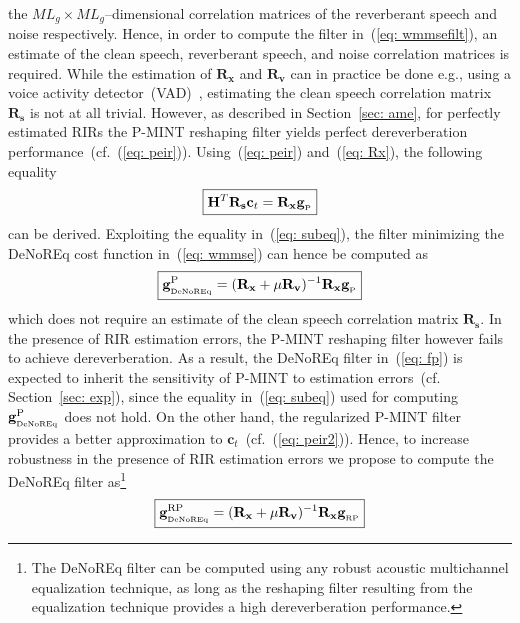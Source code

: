 \documentclass{article}
\begin{document}
the $ML_g \times ML_g$--dimensional correlation matrices of the reverberant speech and noise respectively.
Hence, in order to compute the filter in~(\ref{eq: wmmsefilt}), an estimate of the clean speech, reverberant speech, and noise correlation matrices is required. 
While the estimation of $\mathbf{R}_{\mathbf{x}}$ and $\mathbf{R}_{\mathbf{v}}$ can in practice be done e.g., using a voice activity detector~(VAD)~\cite{Ramirez_SC_2004}, estimating the clean speech correlation matrix $\mathbf{R}_{\mathbf{s}}$ is not at all trivial. 
However, as described in Section~\ref{sec: ame}, for perfectly estimated RIRs the P-MINT reshaping filter yields perfect dereverberation performance~(cf.~(\ref{eq: peir})).
Using~(\ref{eq: peir}) and~(\ref{eq: Rx}), the following equality
\begin{equation}
\label{eq: subeq}
\boxed{\mathbf{H}^T \mathbf{R}_{\mathbf{s}}\mathbf{c}_t = \mathbf{R}_{\mathbf{x}}\mathbf{g}_{_{\rm P}}}
\end{equation}
can be derived.
Exploiting the equality in~(\ref{eq: subeq}), the filter minimizing the DeNoREq cost function in~(\ref{eq: wmmse}) can hence be computed as
\begin{equation}
  \label{eq: fp}
\boxed{\mathbf{g}_{_{\rm DeNoREq}}^{\rm P} = (\mathbf{R}_{\mathbf{x}} + \mu \mathbf{R}_{\mathbf{v}})^{-1} \mathbf{R}_{\mathbf{x}} \mathbf{g}_{_{\rm P}}}
\end{equation}
which does not require an estimate of the clean speech correlation matrix $\mathbf{R}_{\mathbf{s}}$.
In the presence of RIR estimation errors, the P-MINT reshaping filter however fails to achieve dereverberation. 
As a result, the DeNoREq filter in~(\ref{eq: fp}) is expected to inherit the sensitivity of P-MINT to estimation errors~(cf. Section~\ref{sec: exp}), since the equality in~(\ref{eq: subeq}) used for computing $\mathbf{g}_{_{\rm DeNoREq}}^{\rm P}$ does not hold.
On the other hand, the regularized P-MINT filter provides a better approximation to $\mathbf{c}_t$~(cf.~(\ref{eq: peir2})).
Hence, to increase robustness in the presence of RIR estimation errors we propose to compute the DeNoREq filter as\footnote{The DeNoREq filter can be computed using any robust acoustic multichannel equalization technique, as long as the reshaping filter resulting from the equalization technique provides a high dereverberation performance.}
\begin{equation}
  \label{eq: frp}
\boxed{\mathbf{g}_{_{\rm DeNoREq}}^{\rm RP} = (\mathbf{R}_{\mathbf{x}} + \mu \mathbf{R}_{\mathbf{v}})^{-1} \mathbf{R}_{\mathbf{x}} \mathbf{g}_{_{\rm RP}}}
\end{equation}
\end{document}
